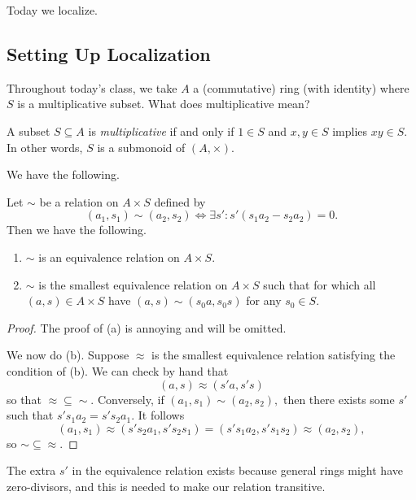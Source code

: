











Today we localize.

\subsection{Setting Up Localization}
Throughout today's class, we take $A$ a (commutative) ring (with identity) where $S$ is a multiplicative subset. What does multiplicative mean?
\begin{definition}[Multiplicative]
    A subset $S\subseteq A$ is \textit{multiplicative} if and only if $1\in S$ and $x,y\in S$ implies $xy\in S.$ In other words, $S$ is a submonoid of $(A,\times).$
\end{definition}
We have the following.
\begin{proposition}
    Let $\sim$ be a relation on $A\times S$ defined by
    \[(a_1,s_1)\sim(a_2,s_2)\iff\exists s':s'(s_1a_2-s_2a_2)=0.\]
    Then we have the following.
    \begin{enumerate}[label=(\alph*)]
        \item $\sim$ is an equivalence relation on $A\times S.$
        \item $\sim$ is the smallest equivalence relation on $A\times S$ such that for which all $(a,s)\in A\times S$ have $(a,s)\sim(s_0a,s_0s)$ for any $s_0\in S.$
    \end{enumerate}
\end{proposition}
\begin{proof}
    The proof of (a) is annoying and will be omitted.

    We now do (b). Suppose $\approx$ is the smallest equivalence relation satisfying the condition of (b). We can check by hand that
    \[(a,s)\approx(s'a,s's)\]
    so that $\approx\subseteq\sim.$ Conversely, if $(a_1,s_1)\sim(a_2,s_2),$ then there exists some $s'$ such that $s's_1a_2=s's_2a_1.$ It follows
    \[(a_1,s_1)\approx(s's_2a_1,s's_2s_1)=(s's_1a_2,s's_1s_2)\approx(a_2,s_2),\]
    so $\sim\subseteq\approx.$
\end{proof}
\begin{remark}
    The extra $s'$ in the equivalence relation exists because general rings might have zero-divisors, and this is needed to make our relation transitive.
\end{remark}
